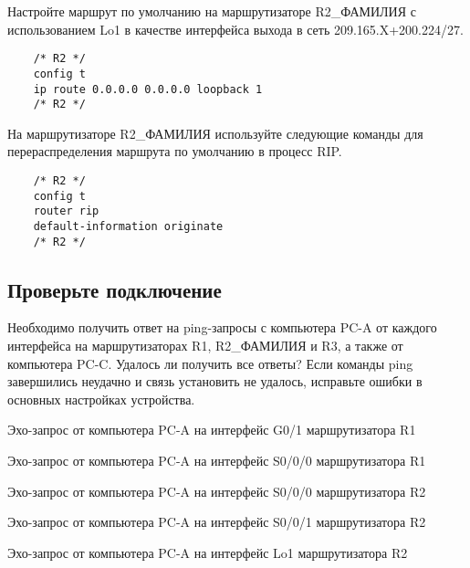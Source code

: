 Настройте маршрут по умолчанию на маршрутизаторе R2\_ФАМИЛИЯ с использованием
Lo1 в качестве интерфейса выхода в сеть 209.165.X+200.224/27.

\begin{verbatim}
    /* R2 */
    config t
    ip route 0.0.0.0 0.0.0.0 loopback 1
    /* R2 */
\end{verbatim}

На маршрутизаторе R2\_ФАМИЛИЯ используйте следующие команды для перераспределения
маршрута по умолчанию в процесс RIP.

\begin{verbatim}
    /* R2 */
    config t
    router rip
    default-information originate
    /* R2 */
\end{verbatim}

\subsection{Проверьте подключение}

Необходимо получить ответ на ping-запросы с компьютера PC-A от каждого интерфейса на
маршрутизаторах R1, R2\_ФАМИЛИЯ и R3, а также от компьютера PC-C. Удалось ли получить
все ответы?
Если команды ping завершились неудачно и связь установить не удалось, исправьте ошибки
в основных настройках устройства.

\begin{image}
    \caption{Эхо-запрос от компьютера PC-A на интерфейс G0/1 маршрутизатора R1}
\end{image}

\begin{image}
    \caption{Эхо-запрос от компьютера PC-A на интерфейс S0/0/0 маршрутизатора R1}
\end{image}

\begin{image}
    \caption{Эхо-запрос от компьютера PC-A на интерфейс S0/0/0 маршрутизатора R2}
\end{image}

\begin{image}
    \caption{Эхо-запрос от компьютера PC-A на интерфейс S0/0/1 маршрутизатора R2}
\end{image}

\begin{image}
    \caption{Эхо-запрос от компьютера PC-A на интерфейс Lo1 маршрутизатора R2}
\end{image}

